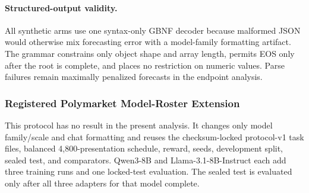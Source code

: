 


\paragraph{Structured-output validity.}
All synthetic arms use one syntax-only GBNF decoder because malformed JSON would
otherwise mix forecasting error with a model-family formatting artifact. The
grammar constrains only object shape and array length, permits EOS only after the
root is complete, and places no restriction on numeric values. Parse failures
remain maximally penalized forecasts in the endpoint analysis.

\subsubsection{Registered Polymarket Model-Roster Extension}
\label{app:exp3b-model-extension}

This protocol has no result in the present analysis. It changes only model
family/scale and chat formatting and reuses the checksum-locked protocol-v1 task files, balanced
4,800-presentation schedule, reward, seeds, development split, sealed test, and
comparators.  Qwen3-8B and Llama-3.1-8B-Instruct each add three training runs and
one locked-test evaluation. The sealed test is evaluated only after all three
adapters for that model complete.

